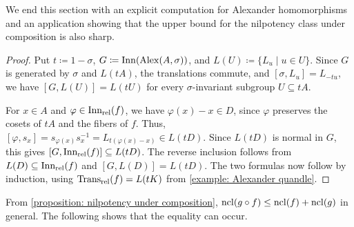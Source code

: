 We end this section with an explicit computation for Alexander homomorphisms and an application showing that the upper bound for the nilpotency class under composition is also sharp.

\begin{proof}
Put $t\coloneqq1-\sigma$, $G\coloneqq\operatorname{Inn}(\operatorname{Alex}(A,\sigma))$,
and $L(U)\coloneqq\{L_u\mid u\in U\}$.
Since $G$ is generated by $\sigma$ and $L(tA)$, the translations
commute, and $[\sigma,L_u]=L_{-tu}$, we have $[G,L(U)]=L(tU)$
for every $\sigma$-invariant subgroup $U\subseteq tA$.

For $x\in A$ and $\varphi\in\operatorname{Inn_{rel}}(f)$, we have
$\varphi(x)-x\in D$, since $\varphi$ preserves the cosets of $tA$
and the fibers of $f$. Thus,
$[\varphi,s_x]=s_{\varphi(x)}s_x^{-1}
=L_{t(\varphi(x)-x)}\in L(tD)$.
Since $L(tD)$ is normal in $G$, this gives
$[G,\operatorname{Inn_{rel}}(f)]\subseteq L(tD)$.
The reverse inclusion follows from $L(D)\subseteq\operatorname{Inn_{rel}}(f)$
and $[G,L(D)]=L(tD)$.
The two formulas now follow by induction, using
$\operatorname{Trans_{rel}}(f)=L(tK)$ from \cref{example: Alexander quandle}.
\end{proof}


From \cref{proposition: nilpotency under composition}, $\operatorname{ncl}(g\circ f)\leq \operatorname{ncl}(f)+\operatorname{ncl}(g)$ in general. The following shows that the equality can occur.


